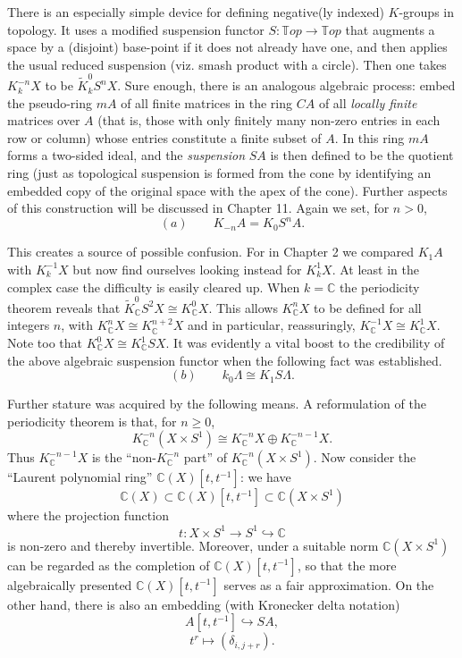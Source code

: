 \documentclass[openany,leqno]{book}  %
\begin{document}
There is an especially simple device for defining negative(ly indexed) $K$-groups in topology. It uses a modified suspension functor $S \colon   \mathbb{T}op \longrightarrow \mathbb{T}op$ that augments a space by a (disjoint) base-point if it does not already have one, and then applies the usual reduced suspension (viz. smash product with a circle). Then one takes $K^{-n}_kX$ to be $\widetilde{K}_k^0S^nX$. Sure enough, there is an analogous algebraic process: embed the pseudo-ring $mA$ of all finite matrices in the ring $CA$ of all {\em locally finite} matrices over $A$ (that is, those with only finitely many non-zero entries in each row or column) whose entries constitute a finite subset of $A$. In this ring $mA$ forms a two-sided ideal, and the {\em suspension} $SA$ is then defined to be the quotient ring (just as topological suspension is formed from the cone by identifying an embedded copy of the original space with the apex of the cone). Further aspects of this construction will be discussed in Chapter 11. Again we set, for $n>0$,
\begin{equation}
 (a)\quad \quad K_{-n}A=K_0S^n A.
\end{equation}


This creates a source of possible confusion. For in Chapter 2 we compared $K_1 A$ with $K^{-1}_k X$ but now find ourselves looking instead for $K^1_kX$. At least in the complex case the difficulty is easily cleared up. When $k = \mathbb{C}$ the periodicity theorem reveals that $\widetilde{K}_{\mathbb{C}}^0 S^2X \cong K^0_\mathbb{C} X$. This allows
$K^n_\mathbb{C} X$ to be defined for all integers $n$, with $K^n_\mathbb{C} X \cong K^{n+2}_\mathbb{C} X$ and in particular, reassuringly,
$K^{-1}_\mathbb{C} X \cong K^{1}_\mathbb{C} X$. Note too that $K^0_\mathbb{C} X \cong K^{1}_\mathbb{C} SX$. It was evidently a vital boost to the credibility of the above algebraic suspension functor when the following fact was established.
\begin{equation}
(b) \quad \quad  k_0\Lambda\cong K_1 S\Lambda.
\end{equation}

Further stature was acquired by the following means. A reformulation of the periodicity theorem is that, for $n \geqslant 0$,
\[K_\mathbb{C}^{-n}(X\times S^1)\cong K_\mathbb{C}^{-n}X\oplus K_\mathbb{C}^{-n-1}X.\]
Thus $K_\mathbb{C}^{-n-1}X$ is the ``non-$K_\mathbb{C}^{-n}$ part'' of $K_\mathbb{C}^{-n}(X\times S^1)$. Now consider the ``Laurent polynomial ring''  $\mathbb{C}(X)[t, t^{-1}]$: we have
\[\mathbb{C}(X)\subset \mathbb{C}(X)[t,t^{-1}]\subset \mathbb{C}(X\times S^1)\]
where the projection function
\[t\colon  X \times S^1 \longrightarrow S^1 \hookrightarrow \mathbb{C}\]
is non-zero and thereby invertible. Moreover, under a suitable norm $\mathbb{C}(X \times S^1)$ can be regarded as the completion of $\mathbb{C}(X)[t, t^{-1}]$, so that the more algebraically presented $\mathbb{C}(X)[t, t^{-1}]$ serves as a fair approximation. On the other hand, there is also an embedding (with Kronecker delta notation)
\[A[t, t^{-1}]\hookrightarrow SA, \]
\[t^r\mapsto (\delta_{i,j+r}). \]
\end{document}
